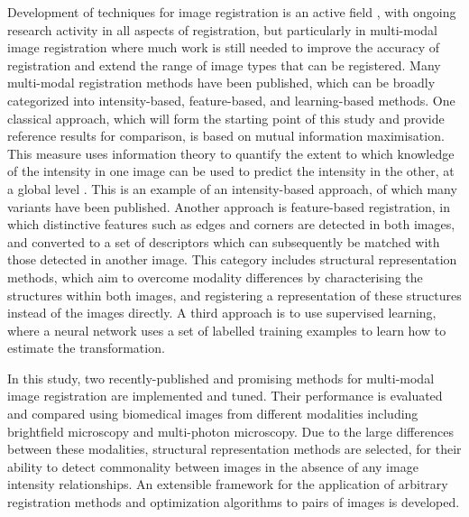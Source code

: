 \documentclass{report}
\begin{document}
Development of techniques for image registration is an active field \citep{oliveira2014medical}, with ongoing research activity in all aspects of registration, but particularly in multi-modal image registration where much work is still needed to improve the accuracy of registration and extend the range of image types that can be registered. Many multi-modal registration methods have been published, which can be broadly categorized into intensity-based, feature-based, and learning-based methods. %
One classical approach, which will form the starting point of this study and provide reference results for comparison, is based on mutual information maximisation. This measure uses information theory to quantify the extent to which knowledge of the intensity in one image can be used to predict the intensity in the other, at a global level \citep{wells1996multi}. This is an example of an intensity-based approach, of which many variants have been published. Another approach is feature-based registration, in which distinctive features such as edges and corners are detected in both images, and converted to a set of descriptors which can subsequently be matched with those detected in another image. This category includes structural representation methods, which aim to overcome modality differences by characterising the structures within both images, and registering a representation of these structures instead of the images directly. A third approach is to use supervised learning, where a neural network uses a set of labelled training examples to learn how to estimate the transformation. %

In this study, two recently-published and promising methods for multi-modal image registration are implemented and tuned. Their performance is evaluated and compared using biomedical images from different modalities including brightfield microscopy and multi-photon microscopy. Due to the large differences between these modalities, structural representation methods are selected, for their ability to detect commonality between images in the absence of any image intensity relationships. An extensible framework for the application of arbitrary registration methods and optimization algorithms to pairs of images is developed. 
\end{document}
